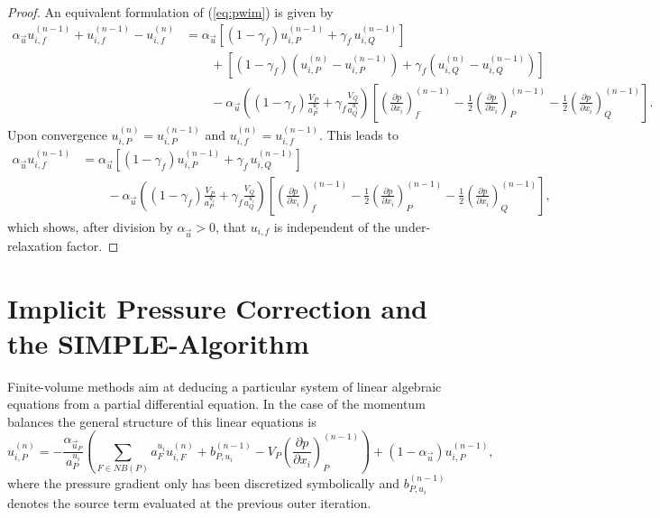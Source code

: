 \begin{proof}
  An equivalent formulation of (\ref{eq:pwim}) is given by
\begin{align*}
  \alpha_\vec{u} u_{i,f}^{(n-1)} + u_{i,f}^{(n-1)} - u_{i,f}^{(n)} 
  &=
  \alpha_\vec{u} \left[\left(1 - \gamma_f\right) u_{i,P}^{(n-1)} + \gamma_f \, u_{i,Q}^{(n-1)} \right] \\[1em]
  &\quad\quad + \left[\left(1 - \gamma_f\right) \left( u_{i,P}^{(n)} - u_{i,P}^{(n-1)}\right) + \gamma_f \left( u_{i,Q}^{(n)} - u_{i,Q}^{(n-1)} \right) \right] \nonumber\\[1em]
  &\quad\quad - 
  \alpha_\vec{u} \left(\left(1 - \gamma_f\right) \frac{ V_P}{a_P^{u_i}} + \gamma_f \frac{V_Q}{a_Q^{u_i}}\right)
  \left[ 
  \left(\frac{\partial p}{\partial x_i}\right)_f^{(n-1)} 
  - \frac{1}{2} \left( \frac{\partial p}{\partial x_i} \right)_P^{(n-1)} 
  - \frac{1}{2} \left(\frac{\partial p}{\partial x_i}\right)_Q^{(n-1)} 
  \right]. \nonumber
\end{align*}
Upon convergence \(u_{i,P}^{(n)} = u_{i,P}^{(n-1)}\) and \(u_{i,f}^{(n)} = u_{i,f}^{(n-1)}\). This leads to
\begin{align*}
  \alpha_\vec{u} u_{i,f}^{(n-1)} 
  &=
  \alpha_\vec{u} \left[\left(1 - \gamma_f\right) u_{i,P}^{(n-1)} + \gamma_f \, u_{i,Q}^{(n-1)} \right] \\[1em]
  &\quad\quad - 
  \alpha_\vec{u} \left(\left(1 - \gamma_f\right) \frac{ V_P}{a_P^{u_i}} + \gamma_f \frac{V_Q}{a_Q^{u_i}}\right)
  \left[ 
  \left(\frac{\partial p}{\partial x_i}\right)_f^{(n-1)} 
  - \frac{1}{2} \left( \frac{\partial p}{\partial x_i} \right)_P^{(n-1)} 
  - \frac{1}{2} \left(\frac{\partial p}{\partial x_i}\right)_Q^{(n-1)} 
  \right], \nonumber
\end{align*}
which shows, after division by \(\alpha_\vec{u} > 0\), that \(u_{i,f}\) is independent of the under-relaxation factor.
\end{proof}

\section{Implicit Pressure Correction and the SIMPLE-Algorithm}
\label{sec:simple}

Finite-volume methods aim at deducing a particular system of linear algebraic equations from a partial differential equation. In the case of the momentum balances the general structure of this linear equations is
\begin{displaymath}
  \label{eq:linfinal}
  u_{i,P}^{(n)} 
  = 
  - \frac{\alpha_{\vec{u}_P}}{a_P^{u_i}} \left(\sum_{F \in NB(P)} a_F^{u_i} u_{i,F}^{(n)}
  +                                     b_{P,u_i}^{(n-1)} 
  -                                     V_P\left(\frac{\partial p}{\partial x_i}\right)_P^{(n-1)} \right)
  + \left(1 - \alpha_{\vec{u}}\right) u_{i,P}^{(n-1)},
\end{displaymath}
where the pressure gradient only has been discretized symbolically and \(b_{P,u_i}^{(n-1)}\) denotes the source term evaluated at the previous outer iteration.

